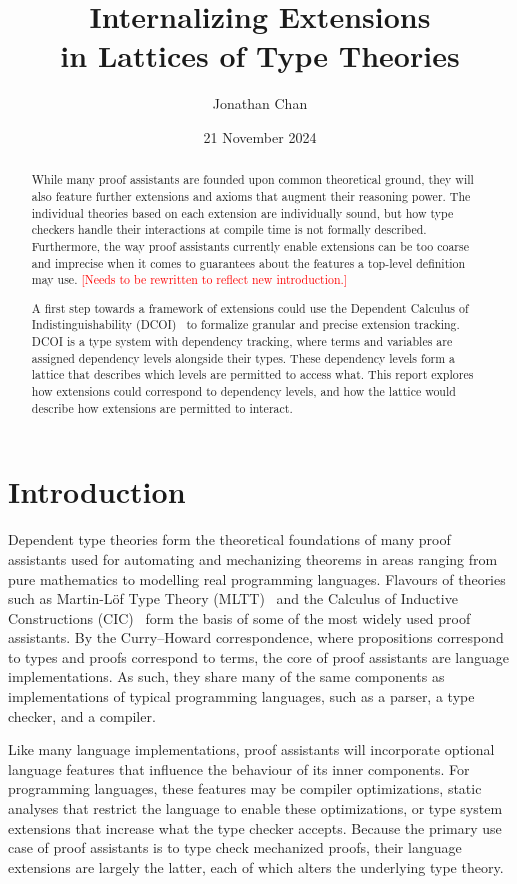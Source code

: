 \documentclass{article}
\title{\textbf{Internalizing Extensions \\ in Lattices of Type Theories}}
\author{Jonathan Chan}
\date{21 November 2024}
\newcommand{\note}[1]{\textcolor{red}{[#1]}}
\begin{document}
\maketitle

\begin{abstract}
  While many proof assistants are founded upon common theoretical ground,
  they will also feature further extensions and axioms
  that augment their reasoning power.
  The individual theories based on each extension are individually sound,
  but how type checkers handle their interactions at compile time
  is not formally described.
  Furthermore, the way proof assistants currently enable extensions
  can be too coarse and imprecise when it comes to
  guarantees about the features a top-level definition may use.
  \note{Needs to be rewritten to reflect new introduction.}

  A first step towards a framework of extensions could use
  the Dependent Calculus of Indistinguishability (DCOI)~\citep{dcoi}
  to formalize granular and precise extension tracking.
  DCOI is a type system with dependency tracking,
  where terms and variables are assigned dependency levels alongside their types.
  These dependency levels form a lattice that describes
  which levels are permitted to access what.
  This report explores how extensions could correspond to dependency levels,
  and how the lattice would describe how extensions are permitted to interact.
\end{abstract}

\section{Introduction}

\iffalse
Dependent type theories form the theoretical foundations of many proof assistants
used for automating and mechanizing theorems in areas ranging from pure mathematics
to modelling real programming languages.
Flavours of theories such as Martin-L\"of Type Theory (MLTT)~\citep{mltt}
and the Calculus of Inductive Constructions (CIC)~\citep{cic}
form the basis of some of the most widely used proof assistants.
By the Curry--Howard correspondence,
where propositions correspond to types and proofs correspond to terms,
the core of proof assistants are language implementations.
As such, they share many of the same components
as implementations of typical programming languages,
such as a parser, a type checker, and a compiler.

Like many language implementations,
proof assistants will incorporate optional language features
that influence the behaviour of its inner components.
For programming languages, these features may be compiler optimizations,
static analyses that restrict the language to enable these optimizations,
or type system extensions that increase what the type checker accepts.
Because the primary use case of proof assistants is to type check mechanized proofs,
their language extensions are largely the latter,
each of which alters the underlying type theory.
\end{document}
